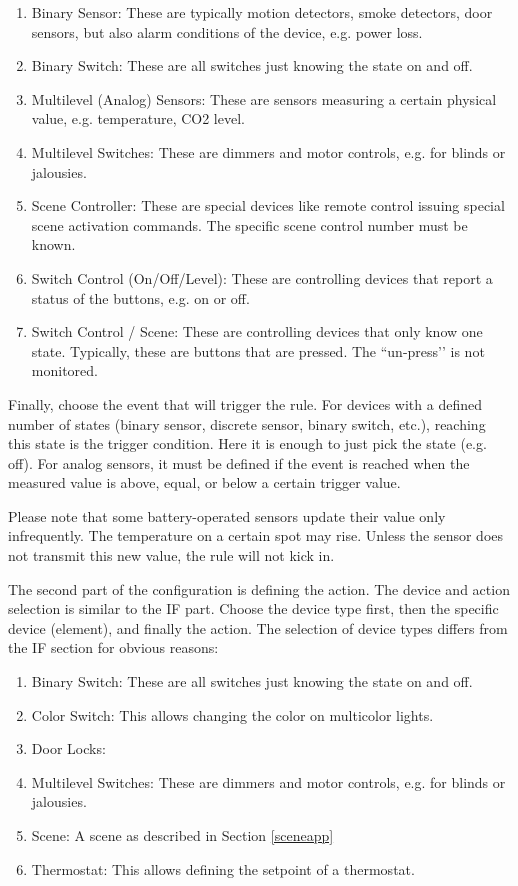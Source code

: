 \begin{enumerate}
\item Binary Sensor: These are typically motion detectors, smoke detectors, door sensors, but also alarm conditions of the device, e.g. power loss.
\item Binary Switch: These are all switches just knowing the state on and off.
\item Multilevel (Analog) Sensors: These are sensors measuring a certain physical value, e.g. temperature, CO2 level.
\item Multilevel Switches: These are dimmers and motor controls, e.g. for blinds or jalousies.
\item Scene Controller: These are special devices like remote control issuing special scene activation commands. The specific scene control number must be known.
\item Switch Control (On/Off/Level): These are controlling devices that report a status of the buttons, e.g. on or off.
\item Switch Control / Scene: These are controlling devices that only know one state. 
Typically, these are buttons that are pressed. The ``un-press’’ is not monitored.
\end{enumerate}

Finally, choose the event that will trigger the  rule. For devices with a defined 
number of states (binary sensor, discrete sensor, binary switch, etc.), reaching this 
state is the trigger condition. Here it is enough to just pick the state (e.g. off).
For analog sensors, it must be defined if the event is reached when the measured value 
is above, equal, or below a certain trigger value.

Please note that some battery-operated sensors update their value only infrequently.
The temperature on a certain spot may rise. Unless the sensor does not transmit this 
new value, the  rule will not kick in.

The second part of the configuration is defining the action. The device and action 
selection is similar to the IF part. Choose the device type first, then the specific 
device (element), and finally the action. The selection of device types differs 
from the IF section for obvious reasons:

\begin{enumerate}

\item Binary Switch: These are all switches just knowing the state on and off.
\item Color Switch: This allows changing the color on multicolor lights.
\item Door Locks:
\item Multilevel Switches: These are dimmers and motor controls, e.g. for blinds or jalousies.
\item Scene: A scene as described in Section \ref{sceneapp}
\item Thermostat: This allows defining the setpoint of a thermostat.
\end{enumerate}

